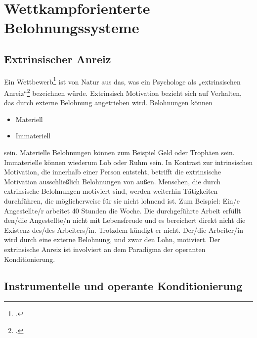 \chapter{Wettkampforienterte Belohnungssysteme}
\reiter
\section{Extrinsischer Anreiz}	
Ein Wettbewerb\footcite{competition-psychology} ist von Natur aus das, was ein Psychologe als „extrinsischen Anreiz“\footcite{extrinsic-motivation} bezeichnen würde.
Extrinsisch Motivation bezieht sich auf Verhalten, das durch externe Belohnung angetrieben wird. Belohnungen können  
\begin{itemize}
	\item Materiell
	\item Immateriell
\end{itemize}	
sein. Materielle Belohnungen können zum Beispiel Geld oder Trophäen sein. Immaterielle können wiederum Lob oder Ruhm sein. In Kontrast zur intrinsischen Motivation, die innerhalb einer Person entsteht, betrifft die extrinsische Motivation ausschließlich Belohnungen von außen. 
Menschen, die durch extrinsische Belohnungen motiviert sind, werden weiterhin Tätigkeiten durchführen, die möglicherweise für sie nicht lohnend ist. 
Zum Beispiel: Ein/e Angestellte/r arbeitet 40 Stunden die Woche. Die durchgeführte Arbeit erfüllt den/die Angestellte/n nicht mit Lebensfreude und es bereichert direkt nicht die Existenz des/des Arbeiters/in. Trotzdem kündigt er nicht. Der/die Arbeiter/in wird durch eine externe Belohnung, und zwar den Lohn, motiviert. 
Der extrinsische Anreiz ist involviert an dem Paradigma der operanten Konditionierung.
\section{Instrumentelle und operante Konditionierung}
\newpage
